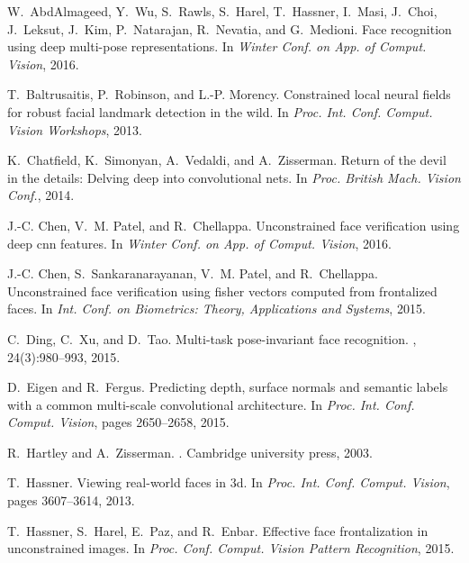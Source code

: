 \documentclass[runningheads]{llncs}
\begin{document}



\begin{thebibliography}{10}\itemsep=-1pt

W.~AbdAlmageed, Y.~Wu, S.~Rawls, S.~Harel, T.~Hassner, I.~Masi, J.~Choi,
  J.~Leksut, J.~Kim, P.~Natarajan, R.~Nevatia, and G.~Medioni.
\newblock Face recognition using deep multi-pose representations.
\newblock In {\em Winter Conf. on App. of Comput. Vision}, 2016.

T.~Baltrusaitis, P.~Robinson, and L.-P. Morency.
\newblock Constrained local neural fields for robust facial landmark detection
  in the wild.
\newblock In {\em Proc. Int. Conf. Comput. Vision Workshops}, 2013.

K.~Chatfield, K.~Simonyan, A.~Vedaldi, and A.~Zisserman.
\newblock Return of the devil in the details: Delving deep into convolutional
  nets.
\newblock In {\em Proc. British Mach. Vision Conf.}, 2014.

J.-C. Chen, V.~M. Patel, and R.~Chellappa.
\newblock Unconstrained face verification using deep cnn features.
\newblock In {\em Winter Conf. on App. of Comput. Vision}, 2016.

J.-C. Chen, S.~Sankaranarayanan, V.~M. Patel, and R.~Chellappa.
\newblock Unconstrained face verification using fisher vectors computed from
  frontalized faces.
\newblock In {\em Int. Conf. on Biometrics: Theory, Applications and Systems},
  2015.

C.~Ding, C.~Xu, and D.~Tao.
\newblock Multi-task pose-invariant face recognition.
, 24(3):980--993, 2015.

D.~Eigen and R.~Fergus.
\newblock Predicting depth, surface normals and semantic labels with a common
  multi-scale convolutional architecture.
\newblock In {\em Proc. Int. Conf. Comput. Vision}, pages 2650--2658, 2015.

R.~Hartley and A.~Zisserman.
.
\newblock Cambridge university press, 2003.

T.~Hassner.
\newblock Viewing real-world faces in 3d.
\newblock In {\em Proc. Int. Conf. Comput. Vision}, pages 3607--3614, 2013.

T.~Hassner, S.~Harel, E.~Paz, and R.~Enbar.
\newblock Effective face frontalization in unconstrained images.
\newblock In {\em Proc. Conf. Comput. Vision Pattern Recognition}, 2015.


\end{thebibliography}
\end{document}

